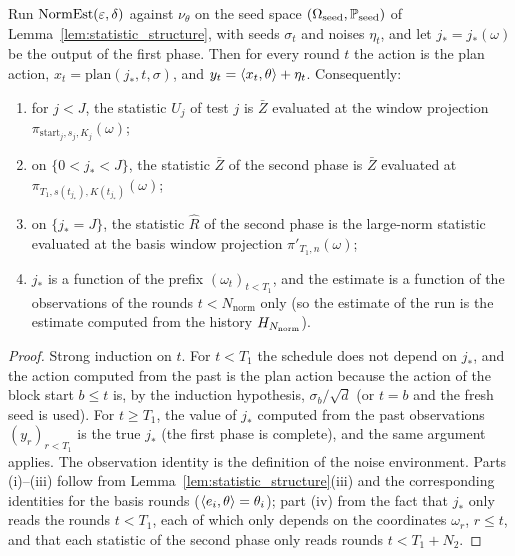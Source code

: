 \begin{lemma}\label{lem:norm_meta_plan}
\leanok
{}
Run $\mathrm{NormEst}(\varepsilon,\delta)$ against $\nu_\theta$ on the seed space
$(\Omega_{\mathrm{seed}}, \mathbb{P}_{\mathrm{seed}})$ of Lemma~\ref{lem:statistic_structure}, with
seeds $\sigma_t$ and noises $\eta_t$, and let $j_* = j_*(\omega)$ be the output of the first
phase. Then for every round $t$ the action is the plan action,
$x_t = \mathrm{plan}(j_*, t, \sigma)$, and $y_t = \langle x_t, \theta \rangle + \eta_t$. Consequently:
\begin{enumerate}
  \item[(i)] for $j < J$, the statistic $U_j$ of test $j$ is $\bar Z$ evaluated at the window
    projection $\pi_{\mathrm{start}_j, s_j, K_j}(\omega)$;
  \item[(ii)] on $\{0 < j_* < J\}$, the statistic $\bar Z$ of the second phase is $\bar Z$
    evaluated at $\pi_{T_1, s(t_{j_*}), K(t_{j_*})}(\omega)$;
  \item[(iii)] on $\{j_* = J\}$, the statistic $\hat R$ of the second phase is the large-norm
    statistic evaluated at the basis window projection $\pi'_{T_1, n}(\omega)$;
  \item[(iv)] $j_*$ is a function of the prefix $(\omega_t)_{t<T_1}$, and the estimate is a
    function of the observations of the rounds $t < N_{\mathrm{norm}}$ only (so the estimate
    of the run is the estimate computed from the history $H_{N_{\mathrm{norm}}}$).
\end{enumerate}
\end{lemma}

\begin{proof}
\leanok
{}
Strong induction on $t$. For $t < T_1$ the schedule does not depend on $j_*$, and the
action computed from the past is the plan action because the action of the block start
$b \le t$ is, by the induction hypothesis, $\sigma_b/\sqrt d$ (or $t = b$ and the fresh seed is
used). For $t \ge T_1$, the value of $j_*$ computed from the past observations
$(y_r)_{r<T_1}$ is the true $j_*$ (the first phase is complete), and the same argument
applies. The observation identity is the definition of the noise environment.
Parts (i)--(iii) follow from Lemma~\ref{lem:statistic_structure}(iii) and the
corresponding identities for the basis rounds ($\langle e_i, \theta \rangle = \theta_i$); part (iv) from
the fact that $j_*$ only reads the rounds $t < T_1$, each of which only depends on the
coordinates $\omega_r$, $r \le t$, and that each statistic of the second phase only reads
rounds $t < T_1 + N_2$.
\end{proof}

